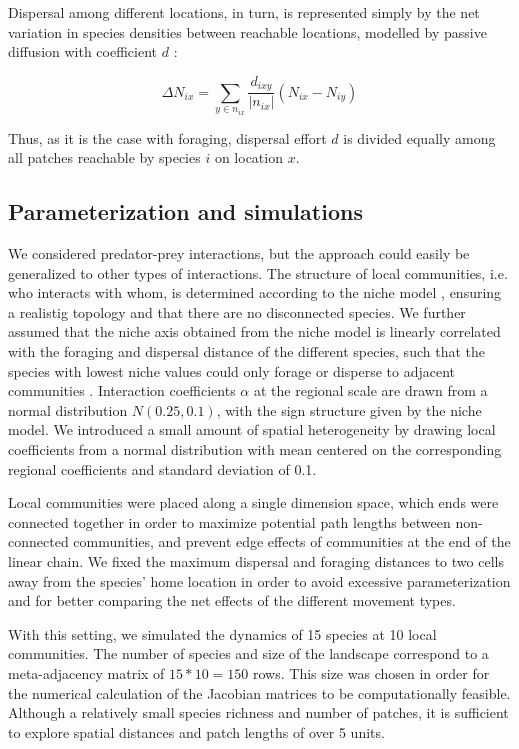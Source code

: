 Dispersal among different locations, in turn, is represented simply by the net variation in species densities between reachable locations, modelled by passive diffusion with coefficient $d$ \citep{Gravel2016a}:

\begin{equation}
\Delta N_{ix} = \sum_{y \in n_{ix}} \frac{d_{ixy}}{\vert n_{ix} \vert} (N_{ix} - N_{iy})
\end{equation}

Thus, as it is the case with foraging, dispersal effort $d$ is divided equally among all patches reachable by species $i$ on location $x$.

\subsection*{Parameterization and simulations}

We considered predator-prey interactions, but the approach could easily be generalized to other types of interactions. The structure of local communities, i.e. who interacts with whom, is determined according to the niche model \citep{Williams2000}, ensuring a realistig topology and that there are no disconnected species. We further assumed that the niche axis obtained from the niche model is linearly correlated with the foraging and dispersal distance of the different species, such that the species with lowest niche values could only forage or disperse to adjacent communities \citep{Jacquet2017}. Interaction coefficients $\alpha$ at the regional scale are drawn from a normal distribution $N(0.25,0.1)$, with the sign structure given by the niche model. We introduced a small amount of spatial heterogeneity by drawing local coefficients from a normal distribution with mean centered on the corresponding regional coefficients and standard deviation of 0.1.

Local communities were placed along a single dimension space, which ends were connected together in order to maximize potential path lengths between non-connected communities, and prevent edge effects of communities at the end of the linear chain. We fixed the maximum dispersal and foraging distances to two cells away from the species' home location in order to avoid excessive parameterization and for better comparing the net effects of the different movement types.

With this setting, we simulated the dynamics of 15 species at 10 local communities. The number of species and size of the landscape correspond to a meta-adjacency matrix of $15*10 = 150$ rows. This size was chosen in order for the numerical calculation of the Jacobian matrices to be computationally feasible. Although a relatively small species richness and number of patches, it is sufficient to explore spatial distances and patch lengths of over 5 units.

